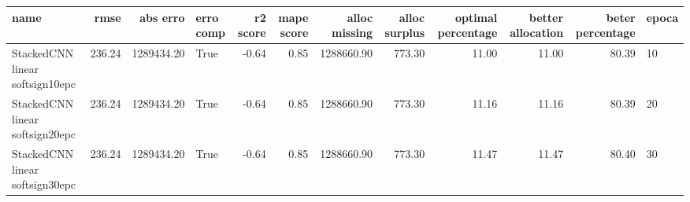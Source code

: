 \begin{tabular}{lrrlrrrrrrrl}
\toprule
name & rmse & abs erro & erro comp & r2 score & mape score & alloc missing & alloc surplus & optimal percentage & better allocation & beter percentage & epoca \\
\midrule
StackedCNN linear softsign10epc & 236.24 & 1289434.20 & True & -0.64 & 0.85 & 1288660.90 & 773.30 & 11.00 & 11.00 & 80.39 & 10 \\
StackedCNN linear softsign20epc & 236.24 & 1289434.20 & True & -0.64 & 0.85 & 1288660.90 & 773.30 & 11.16 & 11.16 & 80.39 & 20 \\
StackedCNN linear softsign30epc & 236.24 & 1289434.20 & True & -0.64 & 0.85 & 1288660.90 & 773.30 & 11.47 & 11.47 & 80.40 & 30 \\
\bottomrule
\end{tabular}
